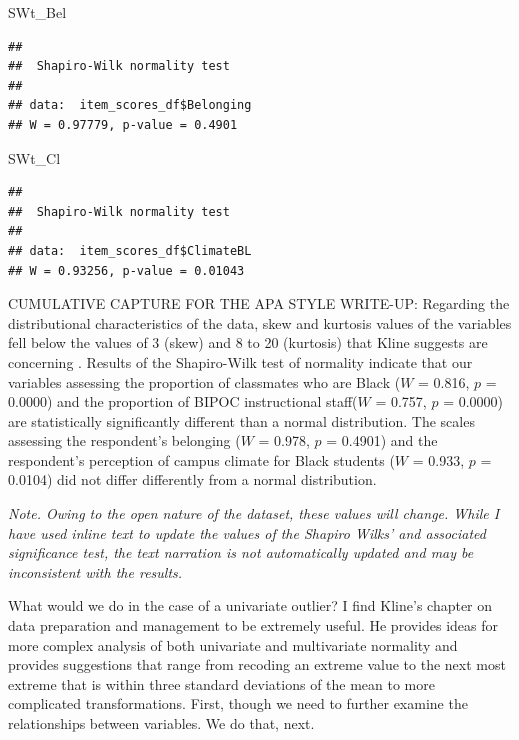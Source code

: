 \documentclass[
  11pt,
]{book}
\newenvironment{Shaded}{\begin{snugshade}}{\end{snugshade}}
\newcommand{\NormalTok}[1]{#1}
\begin{document}
\begin{Shaded}
\begin{Highlighting}[]
\NormalTok{SWt\_Bel}
\end{Highlighting}
\end{Shaded}

\begin{verbatim}
## 
##  Shapiro-Wilk normality test
## 
## data:  item_scores_df$Belonging
## W = 0.97779, p-value = 0.4901
\end{verbatim}

\begin{Shaded}
\begin{Highlighting}[]
\NormalTok{SWt\_Cl}
\end{Highlighting}
\end{Shaded}

\begin{verbatim}
## 
##  Shapiro-Wilk normality test
## 
## data:  item_scores_df$ClimateBL
## W = 0.93256, p-value = 0.01043
\end{verbatim}

CUMULATIVE CAPTURE FOR THE APA STYLE WRITE-UP: Regarding the distributional characteristics of the data, skew and kurtosis values of the variables fell below the values of 3 (skew) and 8 to 20 (kurtosis) that Kline suggests are concerning \citeyearpar{kline_principles_2016}. Results of the Shapiro-Wilk test of normality indicate that our variables assessing the proportion of classmates who are Black (\(W\) = 0.816, \(p\) = 0.0000) and the proportion of BIPOC instructional staff(\(W\) = 0.757, \(p\) = 0.0000) are statistically significantly different than a normal distribution. The scales assessing the respondent's belonging (\(W\) = 0.978, \(p\) = 0.4901) and the respondent's perception of campus climate for Black students (\(W\) = 0.933, \(p\) = 0.0104) did not differ differently from a normal distribution.

\emph{Note. Owing to the open nature of the dataset, these values will change. While I have used inline text to update the values of the Shapiro Wilks' and associated significance test, the text narration is not automatically updated and may be inconsistent with the results.}

What would we do in the case of a univariate outlier? I find Kline's \citeyearpar{kline_principles_2016} chapter on data preparation and management to be extremely useful. He provides ideas for more complex analysis of both univariate and multivariate normality and provides suggestions that range from recoding an extreme value to the next most extreme that is within three standard deviations of the mean to more complicated transformations. First, though we need to further examine the relationships between variables. We do that, next.
\end{document}
